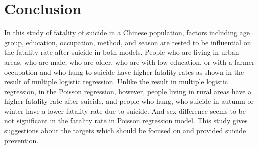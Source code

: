 \documentclass[a4paper]{article}
\begin{document}


\newpage


\newpage
\section*{Conclusion}

In this study of fatality of suicide in a Chinese
population, factors including age group, education, occupation, method, and season are tested to be influential on the fatality rate after suicide in both models. People who are living in urban areas, who are male, who are older, who are with low education, or with a farmer occupation and who hung to suicide have higher fatality rates as shown in the result of multiple logistic regression. Unlike the result in multiple logistic regression, in the Poisson regression, however, people living in rural areas have a higher fatality rate after suicide, and people who hung, who suicide in autumn or winter have a lower fatality rate due to suicide. And sex difference seems to be not significant in the fatality rate in Poisson regression model. This study gives suggestions about the targets which should be focused on and provided suicide prevention. 

\newpage


\end{document}
